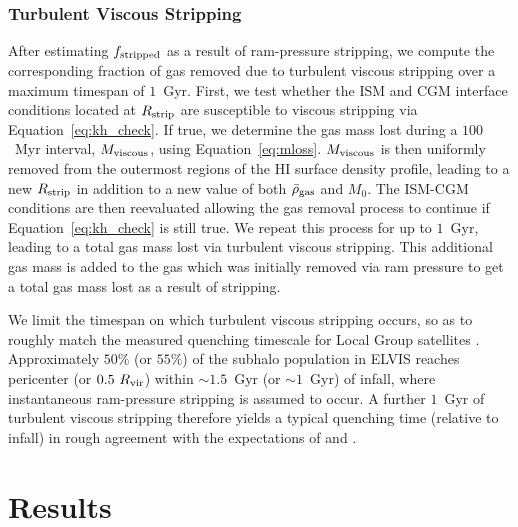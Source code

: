 \subsubsection{Turbulent Viscous Stripping}
%
After estimating $f_{\rm stripped}$ as a result of ram-pressure
stripping, we compute the corresponding fraction of gas removed due to
turbulent viscous stripping over a maximum timespan of $1$~Gyr.
%
First, we test whether the ISM and CGM interface conditions located at
$R_{\rm strip} $ are susceptible to viscous stripping via
Equation~\ref{eq:kh_check}.
%
If true, we determine the gas mass lost during a $100$~Myr
interval, $M_{\rm viscous}$, using Equation~\ref{eq:mloss}.
$M_{\rm viscous}$ is then uniformly removed from the outermost regions of
the H{\scriptsize I} surface density profile, leading to a new $R_{\rm
  strip} $ in addition to a new value of both $\bar{\rho}_{\rm
  gas}$ and $M_{0}$.
The ISM-CGM conditions are then reevaluated allowing the gas removal
process to continue if Equation~\ref{eq:kh_check} is still true. 
We repeat this process for up to $1$~Gyr, leading to a total gas mass
lost via turbulent viscous stripping. 
This additional gas mass is added to the gas which was initially
removed via ram pressure to get a total gas mass lost as a result of
stripping.
%

We limit the timespan on which turbulent viscous stripping occurs, so
as to roughly match the measured quenching timescale for Local Group
satellites \citep[i.e.~$\lesssim 2$~Gyr,][]{fham15}.
%
Approximately $50\%$ (or $55\%$) of the subhalo population in ELVIS
reaches pericenter (or $0.5~R_{\rm vir}$) within $\sim1.5$~Gyr (or
$\sim1$~Gyr) of infall, where instantaneous ram-pressure stripping is
assumed to occur.
%
A further $1$~Gyr of turbulent viscous stripping therefore yields a
typical quenching time (relative to infall) in rough agreement with
the expectations of \citet{fham15} and \citet{wetzel15b}.





\section{Results}
\label{sec:results}

